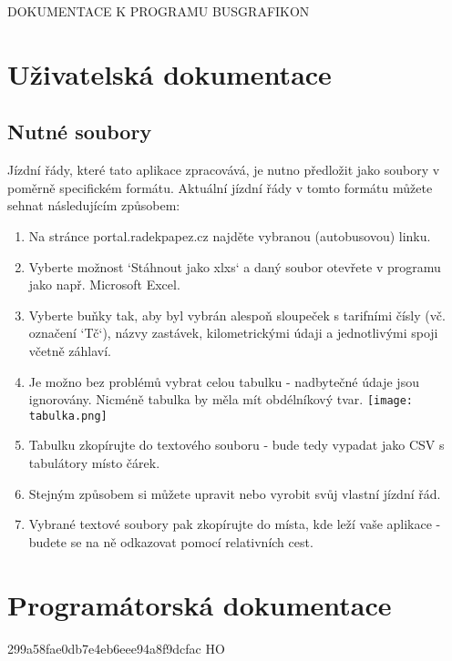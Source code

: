 \documentclass[14pt]{article}
\begin{document}
\begin{center}
  \uppercase{Dokumentace k programu BusGrafikon}
\end{center}

\section{Uživatelská dokumentace}

\subsection{Nutné soubory}
Jízdní řády, které tato aplikace zpracovává, je nutno předložit jako soubory v poměrně specifickém formátu. Aktuální jízdní řády v tomto formátu můžete sehnat následujícím způsobem:
\begin{enumerate}
\item Na stránce portal.radekpapez.cz najděte vybranou (autobusovou) linku.
\item Vyberte možnost `Stáhnout jako xlxs` a daný soubor otevřete v programu jako např. Microsoft Excel.
\item Vyberte buňky tak, aby byl vybrán alespoň sloupeček s tarifními čísly (vč. označení `Tč`), názvy zastávek, kilometrickými údaji a jednotlivými spoji včetně záhlaví.
\item Je možno bez problémů vybrat celou tabulku - nadbytečné údaje jsou ignorovány. Nicméně tabulka by měla mít obdélníkový tvar.  \texttt{[image: tabulka.png]}
\item Tabulku zkopírujte do textového souboru - bude tedy vypadat jako CSV s tabulátory místo čárek.
\item Stejným způsobem si můžete upravit nebo vyrobit svůj vlastní jízdní řád.
\item Vybrané textové soubory pak zkopírujte do místa, kde leží vaše aplikace - budete se na ně odkazovat pomocí relativních cest.
\end{enumerate}

\section{Programátorská dokumentace}
299a58fae0db7e4eb6eee94a8f9dcfac HO
\end{document}
